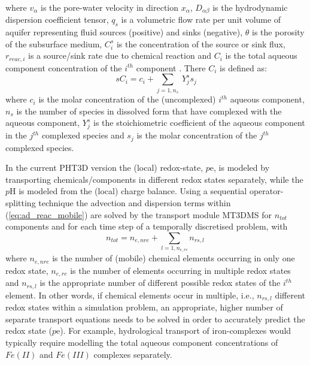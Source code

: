 where $v_{\alpha}$ is the pore-water velocity in direction
$x_{\alpha}$, $D_{\alpha\beta}$ is the hydrodynamic dispersion
coefficient tensor, $q_s$ is a volumetric flow rate per unit
volume of aquifer representing fluid sources (positive) and sinks
(negative), $\theta$ is the porosity of the subsurface medium,
$C^s_i$ is the concentration of the source or sink flux,
$r_{reac,i}$ is a source/sink rate due to chemical reaction and
$C_i$ is the total aqueous component concentration of the $i^{th}$
component \cite[]{yehtri89,enges92}. There $C_i$ is defined as:
\begin{equation}s
{C_i = c_i + \sum_{j=1,n_s} \ Y_{j}^s s_j}  
\label{eq:cj}
\end{equation}
where $c_i$ is the molar concentration of the (uncomplexed)
$i^{th}$ aqueous component, $n_s$ is the number of species in
dissolved form that have complexed with the aqueous component,
$Y_j^s$  is the stoichiometric coefficient of the aqueous
component in the $j^{th}$ complexed species and $s_j$ is the molar
concentration of the $j^{th}$ complexed species.

In the current PHT3D version the (local) redox-state, $p$e, is
modeled by transporting chemicals/components in different redox
states separately, while the $p$H is modeled from the (local)
charge balance. Using a sequential operator-splitting technique
\cite[]{herzer89,val92,miller93,phdzysset,zysset94_2,morka95_1,morka95_2,
barry96,barry97,steefel96} the advection and dispersion terms
within (\ref{eq:ad_reac_mobile}) are solved by the transport
module MT3DMS for $n_{tot}$ components and for each time step of a
temporally discretised problem, with
\begin{equation}
n_{tot} = n_{e,nre} + \sum_{l = 1,n_{e,re}}{n_{rs,l}}  \
\label{eq:ntot_manual}
\end{equation}
where $n_{e,nre}$ is the number of (mobile) chemical elements
occurring in only one redox state, $n_{e,re}$ is the number of
elements occurring in multiple redox states and $n_{rs,l}$ is the
appropriate number of different possible redox states of the
$i^{th}$ element. In other words, if chemical elements occur in
multiple, i.e., $n_{rs,l}$ different redox states within a
simulation problem, an appropriate, higher number of separate
transport equations needs to be solved in order to accurately
predict the redox state ($p$e). For example, hydrological
transport of iron-complexes would typically require modelling the
total aqueous component concentrations of $Fe(II)$ and $Fe(III)$
complexes separately.

